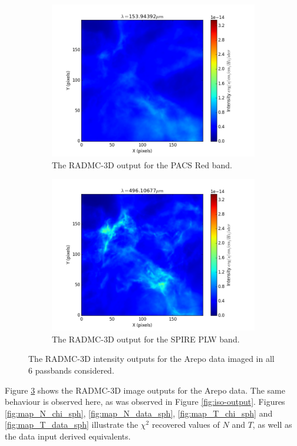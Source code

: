 \documentclass{report}
\begin{document}
\begin{figure}[H]
\begin{subfigure}[b]{.35\linewidth}
\includegraphics[width=\linewidth]{../img/sph/red.png}
\caption{The RADMC-3D output for the PACS Red band.}\label{fig:sphred}
\end{subfigure}
\begin{subfigure}[b]{.35\linewidth}
\includegraphics[width=\linewidth]{../img/sph/plw.png}
\caption{The RADMC-3D output for the SPIRE PLW band.}\label{fig:sphplw}
\end{subfigure}
\caption{The RADMC-3D intensity outputs for the Arepo data imaged in all 6 passbands considered.} \label{fig:sph-output}
\end{figure}

Figure \ref{fig:sph-output} shows the RADMC-3D image outputs for the Arepo data. The same behaviour is observed here, as was observed in Figure \ref{fig:iso-output}. Figures \ref{fig:map_N_chi_sph}, \ref{fig:map_N_data_sph},
\ref{fig:map_T_chi_sph} and \ref{fig:map_T_data_sph} illustrate the $\chi^{2}$ recovered values of $N$ and $T$, as well as the data input derived equivalents.
\end{document}
